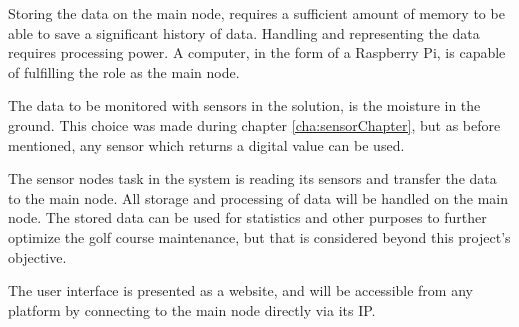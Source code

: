 Storing the data on the main node, requires a sufficient amount of memory to be able to save a significant history of data. Handling and representing the data requires processing power. A computer, in the form of a Raspberry Pi, is capable of fulfilling the role as the main node. 

The data to be monitored with sensors in the solution, is the moisture in the ground. This choice was made during chapter \ref{cha:sensorChapter}, but as before mentioned, any sensor which returns a digital value can be used.

The sensor nodes task in the system is reading its sensors and transfer the data to the main node. All storage and processing of data will be handled on the main node.
The stored data can be used for statistics and other purposes to further optimize the golf course maintenance, but that is considered beyond this project's objective.

The user interface is presented as a website, and will be accessible from any platform by connecting to the main node directly via its IP.